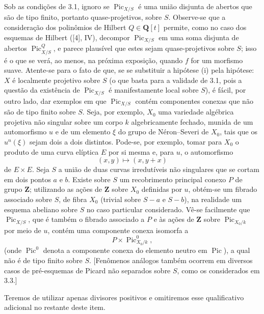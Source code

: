  Sob as condições de 3.1, ignoro se
$\operatorname{Pic}_{X/S}$ é uma união disjunta de abertos que são de tipo
finito, portanto quase-projetivos, sobre $S$.
 Observe-se
que a consideração dos polinômios de Hilbert $Q\in\mathbf Q[t]$ permite, como no
caso dos esquemas de Hilbert ([4], IV), decompor
$\operatorname{Pic}_{X/S}$ em uma soma disjunta de abertos
$\operatorname{Pic}^{Q}_{X/S}$, e parece plausível que estes sejam
quase-projetivos sobre $S$; isso é o que se verá, ao menos, na próxima exposição,
quando $f$ for um morfismo suave. Atente-se para o fato de que, se se substituir
a hipótese (i) pela hipótese: $X$ é localmente projetivo sobre $S$ (o que basta
para a validade de 3.1, pois a questão da existência de
$\operatorname{Pic}_{X/S}$ é manifestamente local sobre $S$), é fácil, por
outro lado,
dar exemplos em que $\operatorname{Pic}_{X/S}$ contém componentes conexas que
não são de tipo finito sobre $S$. Seja, por exemplo, $X_0$ uma variedade
algébrica projetiva não singular sobre um corpo $k$ algebricamente fechado,
munida de um automorfismo $u$ e de um elemento $\xi$ do grupo de
Néron--Severi de $X_0$, tais que os $u^n(\xi)$ sejam dois a dois distintos.
Pode-se, por exemplo, tomar para $X_0$ o produto de uma curva elíptica $E$ por
si mesma e, para $u$, o automorfismo
\[
(x,y)\longmapsto(x,y+x)
\]
de $E\times E$. Seja $S$ a união de duas curvas irredutíveis não singulares que
se cortam em dois pontos $a$ e $b$. Existe sobre $S$ um recobrimento principal
conexo $P$ de grupo $\mathbf Z$; utilizando as ações de $\mathbf Z$ sobre $X_0$
definidas por $u$, obtém-se um fibrado associado sobre $S$, de fibra $X_0$
(trivial sobre $S-a$ e $S-b$), na realidade um esquema abeliano sobre $S$ no
caso particular considerado. Vê-se facilmente que
$\operatorname{Pic}_{X/S}$, que é também o fibrado associado a $P$ e às ações
de $\mathbf Z$ sobre $\operatorname{Pic}_{X_0/k}$ por meio de $u$, contém uma
componente conexa isomorfa a
\[
P\times\operatorname{Pic}^{0}_{X_0/k},
\]
(onde $\operatorname{Pic}^{0}$ denota a componente conexa do elemento neutro
em $\operatorname{Pic}$), a qual não é de tipo finito sobre $S$. [Fenômenos
análogos também ocorrem em diversos casos de pré-esquemas de Picard não
separados sobre $S$, como os considerados em 3.3.]


Teremos de utilizar apenas divisores positivos e omitiremos esse qualificativo
adicional no restante deste item.

